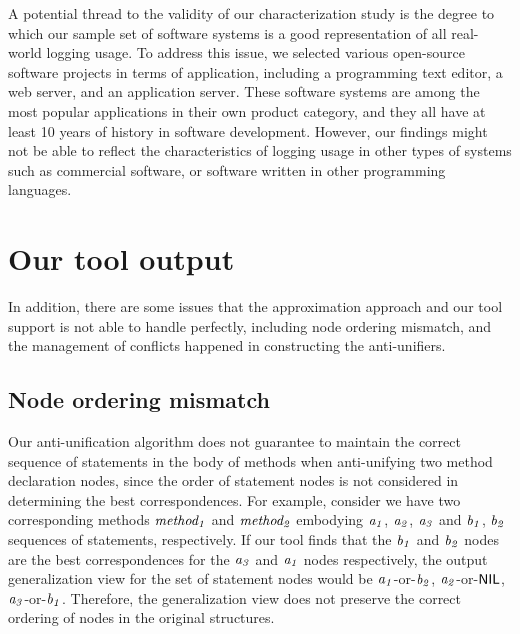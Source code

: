 A potential thread to the validity of our characterization study is the degree to which our sample set of software systems is a good representation of all real-world logging usage. To address this issue, we selected various open-source software projects in terms of application, including a programming text editor, a web server, and an application server. These software systems are among the most popular applications in their own product category, and they all have at least 10 years of history in software development. However, our findings might not be able to reflect the characteristics of logging usage in other types of systems such as commercial software, or software written in other programming languages. 

\section{Our tool output}  \label{limitations}
In addition, there are some issues that the approximation approach and our tool support is not able to handle perfectly, including node ordering mismatch, and the management of conflicts happened in constructing the anti-unifiers.

\subsection{Node ordering mismatch}  \label{mismatch} 
Our anti-unification algorithm does not guarantee to maintain the correct sequence of statements in the body of methods when anti-unifying two method declaration nodes, since the order of statement nodes is not considered in determining the best correspondences. For example, consider we have two corresponding methods $\mathit{method_1}$ and $\mathit{method_2}$ embodying {$\mathit{a_1}$, $\mathit{a_2}$, $\mathit{a_3}$} and {$\mathit{b_1}$, $\mathit{b_2}$} sequences of statements, respectively. If our tool finds that the $\mathit{b_1}$ and $\mathit{b_2}$ nodes are the best correspondences for the $\mathit{a_3}$ and $\mathit{a_1}$ nodes respectively, the output generalization view for the set of statement nodes would be {$\mathit{a_1}$-or-$\mathit{b_2}$, $\mathit{a_2}$-or-$\textsf{NIL}$, $\mathit{a_3}$-or-$\mathit{b_1}$}. Therefore, the generalization view does not preserve the correct ordering of nodes in the original structures.


